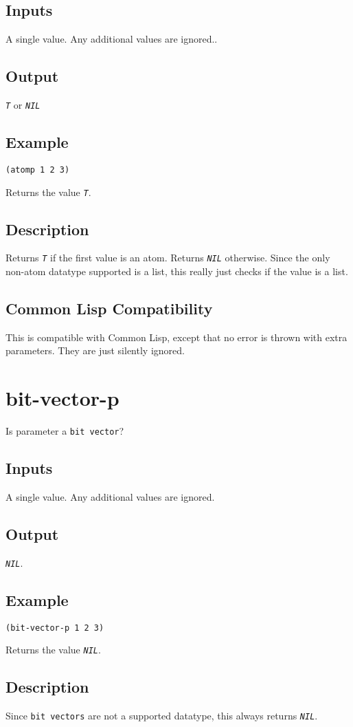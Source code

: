 \documentclass[10pt, openany]{book}
\newcommand{\constant}[1]{\emph{\texttt{#1}}}
\newcommand{\datatype}[1]{\texttt{#1}}
\newcommand{\cl}{Common Lisp}
\begin{document}
\subsection{Inputs}
A single value.  Any additional values are ignored..
\subsection{Output}
\constant{T} or \constant{NIL}
\subsection{Example}
\begin{lstlisting}
(atomp 1 2 3)
\end{lstlisting}
Returns the value \constant{T}.
\subsection{Description}
Returns \constant{T} if the first value is an atom.  Returns \constant{NIL} otherwise.  Since the only non-atom datatype supported is a list, this really just checks if the value is a list.
\subsection{Common Lisp Compatibility}
This is compatible with \cl, except that no error is thrown with extra parameters.  They are just silently ignored.

\section{bit-vector-p}
Is parameter a \datatype{bit vector}?
\subsection{Inputs}
A single value.  Any additional values are ignored.
\subsection{Output}
\constant{NIL}.
\subsection{Example}
\begin{lstlisting}
(bit-vector-p 1 2 3)
\end{lstlisting}
Returns the value \constant{NIL}.
\subsection{Description}
Since \datatype{bit vectors} are not a supported datatype, this always returns \constant{NIL}.
\end{document}
